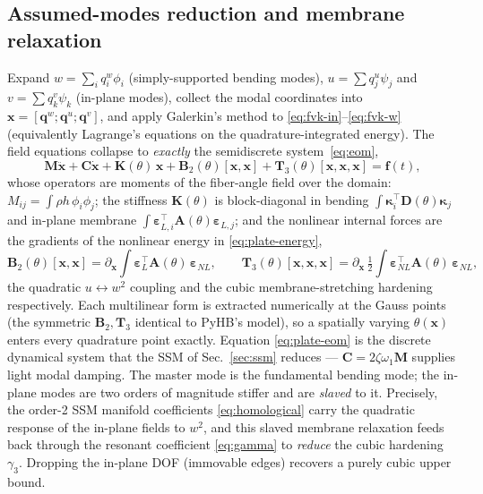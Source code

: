 \documentclass[11pt]{article}
\begin{document}
\subsection{Assumed-modes reduction and membrane relaxation}
Expand $w=\sum_i q^w_i\phi_i$ (simply-supported bending modes),
$u=\sum q^u_j\psi_j$ and $v=\sum q^v_k\psi_k$ (in-plane modes), collect the modal
coordinates into $\bm x=[\bm q^w;\bm q^u;\bm q^v]$, and apply Galerkin's method to
\eqref{eq:fvk-in}--\eqref{eq:fvk-w} (equivalently Lagrange's equations on the
quadrature-integrated energy). The field equations collapse to \emph{exactly} the
semidiscrete system~\eqref{eq:eom},
\begin{equation}
\bm M\ddot{\bm x}+\bm C\dot{\bm x}+\bm K(\theta)\,\bm x
+\bm B_2(\theta)[\bm x,\bm x]+\bm T_3(\theta)[\bm x,\bm x,\bm x]=\bm f(t),
\label{eq:plate-eom}
\end{equation}
whose operators are moments of the fiber-angle field over the domain:
$M_{ij}=\int\!\rho h\,\phi_i\phi_j$; the stiffness $\bm K(\theta)$ is block-diagonal
in bending $\int\!\bm\kappa_i^{\!\top}\bm D(\theta)\bm\kappa_j$ and in-plane membrane
$\int\!\bm\varepsilon_{L,i}^{\!\top}\bm A(\theta)\bm\varepsilon_{L,j}$; and the
nonlinear internal forces are the gradients of the nonlinear energy in
\eqref{eq:plate-energy},
\begin{equation}
\bm B_2(\theta)[\bm x,\bm x]=\partial_{\bm x}\!\!\int\!\bm\varepsilon_L^{\!\top}\bm A(\theta)\,\bm\varepsilon_{NL},
\qquad
\bm T_3(\theta)[\bm x,\bm x,\bm x]=\partial_{\bm x}\,\tfrac12\!\!\int\!\bm\varepsilon_{NL}^{\!\top}\bm A(\theta)\,\bm\varepsilon_{NL},
\label{eq:plate-multilinear}
\end{equation}
the quadratic $u\!\leftrightarrow\!w^2$ coupling and the cubic membrane-stretching
hardening respectively. Each multilinear form is extracted numerically at the Gauss
points (the symmetric $\bm B_2,\bm T_3$ identical to PyHB's model), so a spatially
varying $\theta(\bm x)$ enters every quadrature point exactly. Equation
\eqref{eq:plate-eom} is the discrete dynamical system that the SSM of
Sec.~\ref{sec:ssm} reduces --- $\bm C=2\zeta\omega_1\bm M$ supplies light modal
damping. The
master mode is the fundamental bending mode; the in-plane modes are two orders
of magnitude stiffer and are \emph{slaved} to it. Precisely, the order-2 SSM
manifold coefficients \eqref{eq:homological} carry the quadratic response of the
in-plane fields to $w^2$, and this slaved membrane relaxation feeds back through
the resonant coefficient \eqref{eq:gamma} to \emph{reduce} the cubic hardening
$\gamma_3$. Dropping the in-plane DOF (immovable edges) recovers a purely cubic
upper bound.
\end{document}
